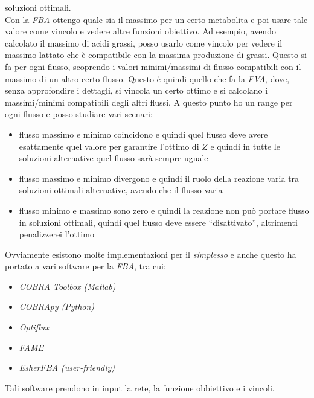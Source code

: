 \documentclass[a4paper,12pt, oneside]{book}
\begin{document}
soluzioni ottimali.\\
Con la \textit{FBA} ottengo quale sia il massimo per un
certo metabolita e poi usare tale valore come vincolo e vedere altre funzioni
obiettivo. Ad esempio, avendo calcolato il massimo di acidi grassi, posso usarlo
come vincolo per vedere il massimo lattato che è compatibile con la massima
produzione di grassi. Questo si fa per ogni flusso, scoprendo i valori
minimi/massimi di flusso compatibili con il massimo di un altro certo
flusso. Questo è quindi quello che fa la \textit{FVA}, dove, senza approfondire
i 
dettagli, si vincola un certo ottimo e si calcolano i massimi/minimi compatibili
degli altri flussi. A questo punto ho un range per ogni flusso e posso studiare
vari scenari:
\begin{itemize}
  \item flusso massimo e minimo coincidono e quindi quel flusso deve avere
  esattamente quel valore per garantire l'ottimo di $Z$ e quindi in tutte le
  soluzioni alternative quel flusso sarà sempre uguale
  \item flusso massimo e minimo divergono e quindi il ruolo della reazione varia
  tra soluzioni ottimali alternative, avendo che il flusso varia
  \item flusso minimo e massimo sono zero e quindi la reazione non può portare
  flusso in soluzioni ottimali, quindi quel flusso deve essere ``disattivato'',
  altrimenti penalizzerei l'ottimo
\end{itemize}
Ovviamente esistono molte implementazioni per il \textit{simplesso} e anche
questo ha portato a vari software per la \textit{FBA}, tra cui:
\begin{multicols}{2}
  \begin{itemize}
    \item \textit{COBRA Toolbox (Matlab)}
    \item \textit{COBRApy (Python)}
    \item \textit{Optiflux}
    \item \textit{FAME}
    \item \textit{EsherFBA (user-friendly)}
  \end{itemize}
\end{multicols}
Tali software prendono in input la rete, la funzione obbiettivo e i vincoli.
\end{document}
